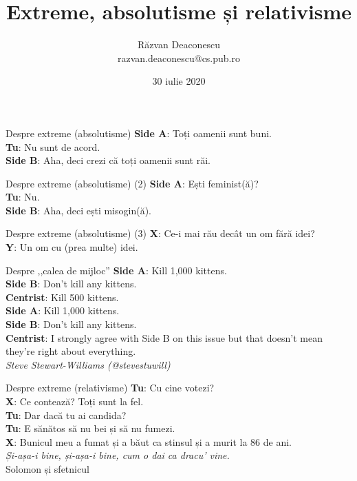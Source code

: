 \documentclass{simple}
\title[Extreme, absolutisme și relativisme]{Extreme, absolutisme și relativisme}
\institute{InfoEducație 2020 (online)}
\author[Răzvan Deaconescu]{Răzvan Deaconescu \\
razvan.deaconescu@cs.pub.ro}
\date{30 iulie 2020}
\begin{document}
\frame{\titlepage}

\begin{frame}{Despre extreme (absolutisme)}
  \pause
  \textbf{Side A}: Toți oamenii sunt buni. \\
  \textbf{Tu}: Nu sunt de acord. \\
  \textbf{Side B}: Aha, deci crezi că toți oamenii sunt răi. \\
\end{frame}

\begin{frame}{Despre extreme (absolutisme) (2)}
  \pause
  \textbf{Side A}: Ești feminist(ă)? \\
  \textbf{Tu}: Nu. \\
  \textbf{Side B}: Aha, deci ești misogin(ă). \\
\end{frame}

\begin{frame}{Despre extreme (absolutisme) (3)}
  \pause
  \textbf{X}: Ce-i mai rău decât un om fără idei? \\
  \textbf{Y}: Un om cu (prea multe) idei.
\end{frame}

\begin{frame}{Despre ,,calea de mijloc''}
  \pause
  \textbf{Side A}: Kill 1,000 kittens. \\
  \textbf{Side B}: Don't kill any kittens. \\
  \textbf{Centrist}: Kill 500 kittens. \\
  \vspace{3mm}
  \pause
  \textbf{Side A}: Kill 1,000 kittens. \\
  \textbf{Side B}: Don't kill any kittens. \\
  \textbf{Centrist}: I strongly agree with Side B on this issue but that doesn't mean they're right about everything. \\
  \vspace{5mm}
  \hfill \textit{Steve Stewart-Williams (@stevestuwill)}
\end{frame}

\begin{frame}{Despre extreme (relativisme)}
  \pause
  \textbf{Tu}: Cu cine votezi? \\
  \textbf{X}: Ce contează? Toți sunt la fel. \\
  \textbf{Tu}: Dar dacă tu ai candida? \\
  \vspace{3mm}
  \pause
  \textbf{Tu}: E sănătos să nu bei și să nu fumezi. \\
  \textbf{X}: Bunicul meu a fumat și a băut ca stinsul și a murit la 86 de ani. \\
  \vspace{3mm}
  \pause
  \textit{Și-așa-i bine, și-așa-i bine, cum o dai ca dracu' vine.} \\
  \vspace{3mm}
  \pause
  Solomon și sfetnicul
\end{frame}
\end{document}
